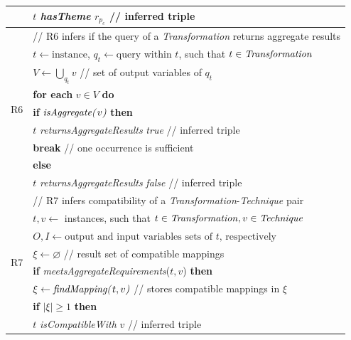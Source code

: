 \documentclass[]{interact}
\theoremstyle{plain}%
\theoremstyle{definition}
\theoremstyle{remark}
\theoremstyle{definition}
\begin{document}
\begin{tiny}
\begin{table}[htbp]
\begin{tabular}{p{0.5cm}l}
	& \quad \quad $t$ \textit{hasTheme} $r_{p_c}$ // inferred triple\\
	\hline
	\multirow{9}{*}{R6} & // R6 infers if the query of a \textit{Transformation} returns aggregate results\\
	&  $t \leftarrow \text{instance}$, $q_t \leftarrow \text{query within } t$, such that $t \in \text{\textit{Transformation}}$ \\
	& $V \leftarrow \bigcup_{q_t} v$ // set of output variables of $q_t$\\
	&  \textbf{for each} $v \in V$ \textbf{do} \\
	& \quad \textbf{if} $\text{\textit{isAggregate(}}v\text{\textit{)}}$ \textbf{then} \\
	& \quad \quad $t$ \textit{returnsAggregateResults} \textit{true} // inferred triple\\
	& \quad \quad \textbf{break} // one occurrence is sufficient \\
	& \quad \textbf{else} \\
	& \quad \quad $t$ \textit{returnsAggregateResults} \textit{false} // inferred triple\\
	\hline
	\multirow{8}{*}{R7} & // R7 infers compatibility of a \textit{Transformation}-\textit{Technique} pair \\
	& $t,v \leftarrow$ instances, such that $t \in \text{\textit{Transformation}}, v \in \text{\textit{Technique}}$ \\
	& $O,I \leftarrow \text{output and input variables sets of $t$, respectively}$\\
	& $\xi \leftarrow \varnothing$ // result set of compatible mappings \\
	& \textbf{if} \textit{meetsAggregateRequirements}($t,v$) \textbf{then} \\
	& \quad $\xi \leftarrow \text{\textit{findMapping(}}t,v\text{\textit{)}}$ // stores compatible mappings in $\xi$ \\
	&\quad \textbf{if} $|\xi|\geq 1$ \textbf{then}\\
	&\quad \quad $t$ \textit{isCompatibleWith} $v$ // inferred triple \\
    \bottomrule
\end{tabular}
\end{table}
\end{tiny}


\end{document}
